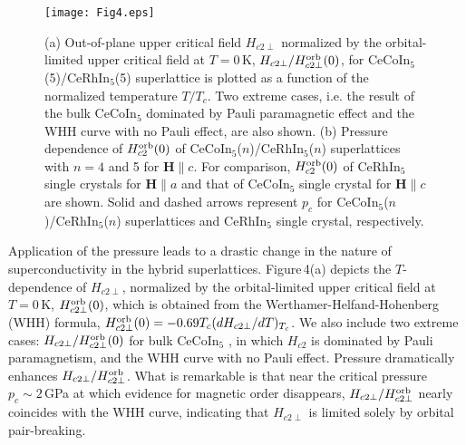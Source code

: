 \documentclass[twocolumn,preprintnumbers,amsmath,amssymb,prl]{revtex4}
\begin{document}
\begin{figure}[t]
 	\begin{center}
 		\texttt{[image: Fig4.eps]}
 		\caption{
		(a) Out-of-plane upper critical field $H_{c2\perp}$ normalized by the orbital-limited upper critical field at $T=0$\,K, $H_{c2\perp}/H_{c2\perp}^{\rm orb}(0)$, for CeCoIn$_5$(5)/CeRhIn$_5$(5) superlattice is plotted as a function of the normalized temperature $T/T_c$.   Two extreme cases, i.e.  the result of  the bulk CeCoIn$_5$ dominated by Pauli paramagnetic effect and the WHH curve with no Pauli effect, are also shown.  (b) Pressure dependence of $H_{c2}^{\rm orb}(0)$ of CeCoIn$_5$($n$)/CeRhIn$_5$($n$) superlattices with $n=4$ and 5 for ${\bm H}$$\parallel$$c$.   For comparison, $H_{c2}^{\rm orb}(0)$ of CeRhIn$_5$ single crystals  for ${\bm H}$$\parallel$$a$ and that of CeCoIn$_5$ single crystal for ${\bm H}$$\parallel$$c$ are shown. 
Solid and dashed arrows represent $p_c$ for CeCoIn$_5$($n$)/CeRhIn$_5$($n$) superlattices and CeRhIn$_5$ single crystal, respectively. 
 		}
 		\label{fig:Fig1.eps}
 	\end{center}
 \end{figure}



Application of the pressure leads to a drastic change in the nature of  superconductivity in the hybrid superlattices.   Figure\,4(a) depicts the $T$-dependence of $H_{c2\perp}$, normalized by the orbital-limited upper critical field at $T=0$\,K, $H_{c2\perp}^{\rm orb}(0)$, which is obtained from  the Werthamer-Helfand-Hohenberg (WHH) formula, $H_{c2\perp}^{\rm orb}(0)=-0.69T_c(dH_{c2\perp}/dT)_{T_c}$.  We also include two extreme cases: $H_{c2\perp}/H_{c2\perp}^{\rm orb}(0)$ for  bulk CeCoIn$_5$ \cite{Tayama}, in which $H_{c2}$  is dominated by Pauli paramagnetism, and the WHH curve with no Pauli effect.   Pressure dramatically enhances $H_{c2\perp}/H_{c2\perp}^{\rm orb}$.  What is remarkable is that  near  the critical pressure $p_c\sim 2$\,GPa at which  evidence for magnetic order  disappears, $H_{c2\perp}/H_{c2\perp}^{\rm orb}$ nearly coincides with the WHH curve, indicating that $H_{c2\perp}$ is limited solely by orbital pair-breaking.  
\end{document}
